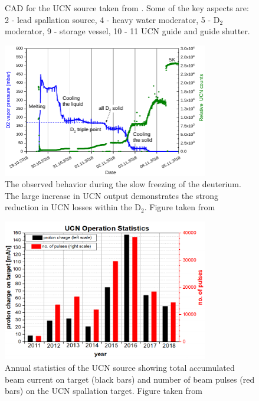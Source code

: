 \begin{refsection}
\begin{figure}
                \caption{CAD for the UCN source taken from  \cite{PSI:review:2021}. Some of the key aspects are: 2 - lead spallation source, 4 - heavy water moderator, 5 - D$_2$ moderator, 9 - storage vessel, 10 - 11 UCN guide and guide shutter.}
                \label{fig:UCN_CAD}
            \end{figure}
            \begin{figure}
                \centering
                \includegraphics[width = 0.8\textwidth]{Figures/Introduction/UCN_behaviour.png}
                \caption{The observed behavior during the slow freezing of the deuterium. The large increase in UCN output demonstrates the strong reduction in UCN losses within the D$_2$. 
                Figure taken from \cite{PSI:review:2021}}
                \label{fig:UCN_behaviour}
            \end{figure}
            \begin{figure}
                \centering
                \includegraphics[width = 0.8\textwidth]{Figures/Introduction/UCN_stats.png}
                \caption{Annual statistics of the UCN source showing total accumulated beam current on target (black bars) and number of beam pulses (red bars) on the UCN spallation target. 
                Figure taken from \cite{PSI:review:2021}}
                \label{fig:UCN_stats}
            \end{figure}
            

\end{refsection}
